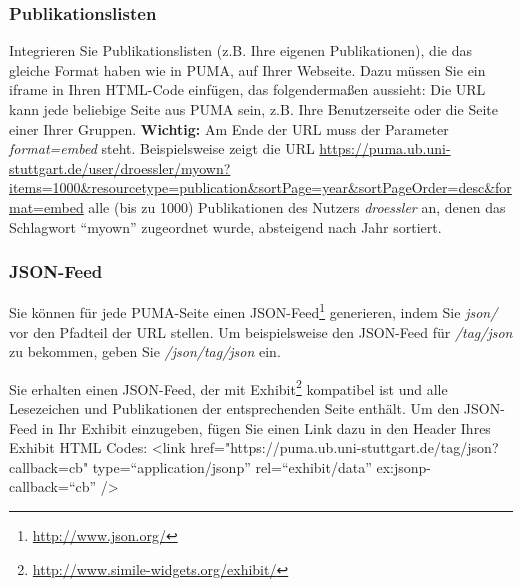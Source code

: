 \documentclass[b5paper,11pt,twoside]{scrbook} %
\begin{document}
\subsubsection{Publikationslisten}
Integrieren Sie Publikationslisten (z.B. Ihre eigenen Publikationen), die das gleiche Format haben wie in PUMA, auf Ihrer Webseite. Dazu müssen Sie ein iframe in Ihren HTML-Code einfügen, das folgendermaßen aussieht: %
\newline Die URL kann jede beliebige Seite aus PUMA sein, z.B. Ihre Benutzerseite oder die Seite einer Ihrer Gruppen. \textbf{Wichtig:} Am Ende der URL muss der Parameter \textit{format=embed} steht. Beispielsweise zeigt die URL \url{https://puma.ub.uni-stuttgart.de/user/droessler/myown?items=1000&resourcetype=publication&sortPage=year&sortPageOrder=desc&format=embed}
alle (bis zu 1000) Publikationen des Nutzers \textit{droessler} an, denen das Schlagwort \enquote{myown} zugeordnet wurde, absteigend nach Jahr sortiert.

\subsubsection{JSON-Feed}
Sie können für jede PUMA-Seite einen JSON-Feed\footnote{\url{http://www.json.org/}} generieren, indem Sie \textit{json/} vor den Pfadteil der URL stellen. Um beispielsweise den JSON-Feed für \textit{/tag/json} zu bekommen, geben Sie \textit{/json/tag/json} ein.

Sie erhalten einen JSON-Feed, der mit Exhibit\footnote{\url{http://www.simile-widgets.org/exhibit/}} kompatibel ist und alle Lesezeichen und Publikationen der entsprechenden Seite enthält. Um den JSON-Feed in Ihr Exhibit einzugeben, fügen Sie einen Link dazu in den Header Ihres Exhibit HTML Codes:\newline
\newline
<link href="https://puma.ub.uni-stuttgart.de/tag/json?callback=cb" type=\enquote{application/jsonp} rel=\enquote{exhibit/data} ex:jsonp-callback=\enquote{cb} />%
\newline
\end{document}
